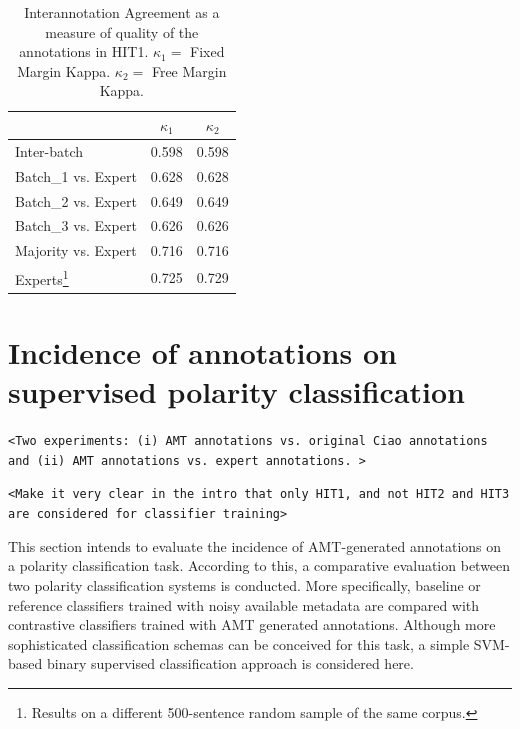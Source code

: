 \documentclass[11pt,letterpaper]{article}
\begin{document}
\begin{table}[h]
\begin{center}
\begin{tabular}{|l|c|c|}
\hline
& $\kappa_{1}$ & $\kappa_{2}$ \\ 
\hline
Inter-batch & 0.598 & 0.598 \\ \hline
Batch\_1 vs. Expert & 0.628 & 0.628\\
Batch\_2 vs. Expert & 0.649 & 0.649\\
Batch\_3 vs. Expert & 0.626 & 0.626\\ \hline
Majority vs. Expert & 0.716 & 0.716\\ \hline
Experts\footnote{Results on a different 500-sentence random sample of the same corpus.} & 0.725 & 0.729\\ \hline
\end{tabular}
\end{center}
\label{table.ita}
\caption{Interannotation Agreement as a measure of quality of the annotations in HIT1. $\kappa_{1} = $ Fixed Margin Kappa. $\kappa_{2} = $ Free Margin Kappa.}
\end{table}












\section{Incidence of annotations on supervised polarity classification}
\label{sect:classifier}

\texttt{<Two experiments: (i) AMT annotations vs. original Ciao annotations and (ii) AMT annotations vs. expert annotations. >}

\texttt{<Make it very clear in the intro that only HIT1, and not HIT2 and HIT3 are considered for classifier training>}

This section intends to evaluate the incidence of AMT-generated annotations on a polarity classification task.
According to this, a comparative evaluation between two polarity classification systems is conducted. 
More specifically, baseline or reference classifiers trained with noisy available metadata are compared with 
contrastive classifiers trained with AMT generated annotations.  
Although more sophisticated classification schemas can be conceived for this task, a simple SVM-based binary supervised classification approach is considered here.
\end{document}
